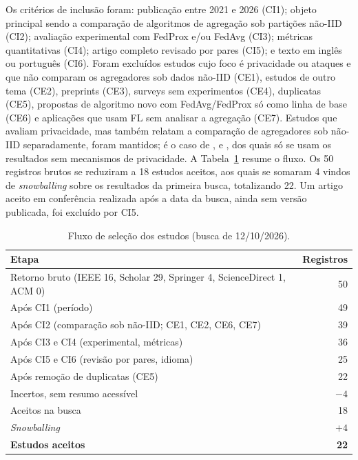 Os critérios de inclusão foram: publicação entre 2021 e 2026 (CI1); objeto principal sendo a comparação de algoritmos de agregação sob partições não-IID (CI2); avaliação experimental com FedProx e/ou FedAvg (CI3); métricas quantitativas (CI4); artigo completo revisado por pares (CI5); e texto em inglês ou português (CI6). Foram excluídos estudos cujo foco é privacidade ou ataques e que não comparam os agregadores sob dados não-IID (CE1), estudos de outro tema (CE2), preprints (CE3), surveys sem experimentos (CE4), duplicatas (CE5), propostas de algoritmo novo com FedAvg/FedProx só como linha de base (CE6) e aplicações que usam FL sem analisar a agregação (CE7). Estudos que avaliam privacidade, mas também relatam a comparação de agregadores sob não-IID separadamente, foram mantidos; é o caso de \citet{enang2026optimiser}, \citet{vajjhula2025har} e \citet{marella2025fedonco}, dos quais só se usam os resultados sem mecanismos de privacidade. A Tabela~\ref{tab:fluxo} resume o fluxo. Os 50 registros brutos se reduziram a 18 estudos aceitos, aos quais se somaram 4 vindos de \textit{snowballing} sobre os resultados da primeira busca, totalizando 22. Um artigo aceito em conferência realizada após a data da busca, ainda sem versão publicada, foi excluído por CI5.

\begin{table}[ht]
    \centering\small
    \caption{Fluxo de seleção dos estudos (busca de 12/10/2026).}
    \label{tab:fluxo}
    \begin{tabular}{@{}p{6.6cm}r@{}}
        \toprule
        Etapa & Registros \\
        \midrule
        Retorno bruto (IEEE 16, Scholar 29, Springer 4, ScienceDirect 1, ACM 0) & 50 \\
        Após CI1 (período) & 49 \\
        Após CI2 (comparação sob não-IID; CE1, CE2, CE6, CE7) & 39 \\
        Após CI3 e CI4 (experimental, métricas) & 36 \\
        Após CI5 e CI6 (revisão por pares, idioma) & 25 \\
        Após remoção de duplicatas (CE5) & 22 \\
        Incertos, sem resumo acessível & $-4$ \\
        Aceitos na busca & 18 \\
        \textit{Snowballing} & $+4$ \\
        \midrule
        \textbf{Estudos aceitos} & \textbf{22} \\
        \bottomrule
    \end{tabular}
\end{table}

